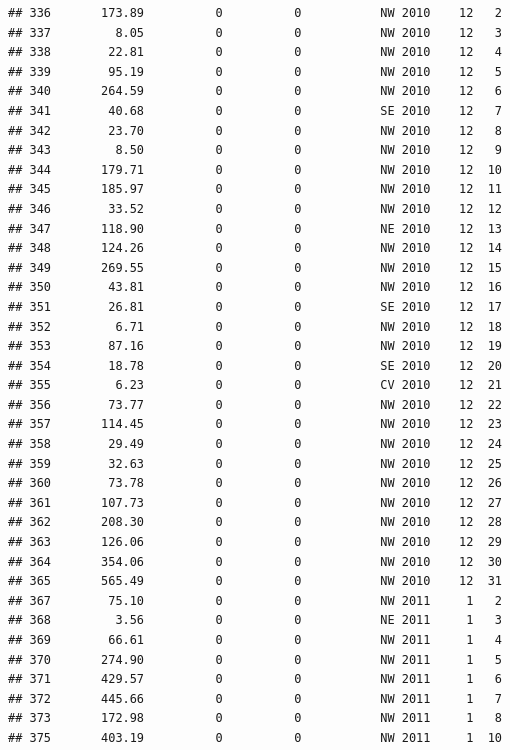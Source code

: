 \documentclass[
]{article}
\begin{document}
\begin{verbatim}
## 336       173.89          0          0           NW 2010    12   2
## 337         8.05          0          0           NW 2010    12   3
## 338        22.81          0          0           NW 2010    12   4
## 339        95.19          0          0           NW 2010    12   5
## 340       264.59          0          0           NW 2010    12   6
## 341        40.68          0          0           SE 2010    12   7
## 342        23.70          0          0           NW 2010    12   8
## 343         8.50          0          0           NW 2010    12   9
## 344       179.71          0          0           NW 2010    12  10
## 345       185.97          0          0           NW 2010    12  11
## 346        33.52          0          0           NW 2010    12  12
## 347       118.90          0          0           NE 2010    12  13
## 348       124.26          0          0           NW 2010    12  14
## 349       269.55          0          0           NW 2010    12  15
## 350        43.81          0          0           NW 2010    12  16
## 351        26.81          0          0           SE 2010    12  17
## 352         6.71          0          0           NW 2010    12  18
## 353        87.16          0          0           NW 2010    12  19
## 354        18.78          0          0           SE 2010    12  20
## 355         6.23          0          0           CV 2010    12  21
## 356        73.77          0          0           NW 2010    12  22
## 357       114.45          0          0           NW 2010    12  23
## 358        29.49          0          0           NW 2010    12  24
## 359        32.63          0          0           NW 2010    12  25
## 360        73.78          0          0           NW 2010    12  26
## 361       107.73          0          0           NW 2010    12  27
## 362       208.30          0          0           NW 2010    12  28
## 363       126.06          0          0           NW 2010    12  29
## 364       354.06          0          0           NW 2010    12  30
## 365       565.49          0          0           NW 2010    12  31
## 367        75.10          0          0           NW 2011     1   2
## 368         3.56          0          0           NE 2011     1   3
## 369        66.61          0          0           NW 2011     1   4
## 370       274.90          0          0           NW 2011     1   5
## 371       429.57          0          0           NW 2011     1   6
## 372       445.66          0          0           NW 2011     1   7
## 373       172.98          0          0           NW 2011     1   8
## 375       403.19          0          0           NW 2011     1  10

\end{verbatim}
\end{document}
